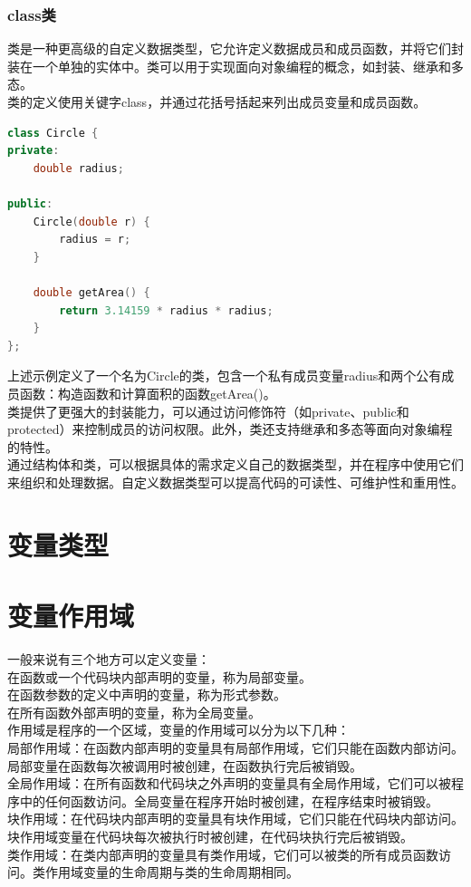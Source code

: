 \documentclass[12pt,twiside,a4paper]{ctexbook}
\numberwithin{chapter}{part}
\begin{document}
\subsubsection{class类}
类是一种更高级的自定义数据类型，它允许定义数据成员和成员函数，并将它们封装在一个单独的实体中。类可以用于实现面向对象编程的概念，如封装、继承和多态。\\
类的定义使用关键字class，并通过花括号括起来列出成员变量和成员函数。
\begin{lstlisting}[language=C++]
class Circle {
private:
    double radius;

public:
    Circle(double r) {
        radius = r;
    }

    double getArea() {
        return 3.14159 * radius * radius;
    }
};
\end{lstlisting}
上述示例定义了一个名为Circle的类，包含一个私有成员变量radius和两个公有成员函数：构造函数和计算面积的函数getArea()。\\
类提供了更强大的封装能力，可以通过访问修饰符（如private、public和protected）来控制成员的访问权限。此外，类还支持继承和多态等面向对象编程的特性。\\
通过结构体和类，可以根据具体的需求定义自己的数据类型，并在程序中使用它们来组织和处理数据。自定义数据类型可以提高代码的可读性、可维护性和重用性。

\section{变量类型}

\section{变量作用域}
一般来说有三个地方可以定义变量：\\
在函数或一个代码块内部声明的变量，称为局部变量。\\
在函数参数的定义中声明的变量，称为形式参数。\\
在所有函数外部声明的变量，称为全局变量。\\
作用域是程序的一个区域，变量的作用域可以分为以下几种：\\
局部作用域：在函数内部声明的变量具有局部作用域，它们只能在函数内部访问。局部变量在函数每次被调用时被创建，在函数执行完后被销毁。\\
全局作用域：在所有函数和代码块之外声明的变量具有全局作用域，它们可以被程序中的任何函数访问。全局变量在程序开始时被创建，在程序结束时被销毁。\\
块作用域：在代码块内部声明的变量具有块作用域，它们只能在代码块内部访问。块作用域变量在代码块每次被执行时被创建，在代码块执行完后被销毁。\\
类作用域：在类内部声明的变量具有类作用域，它们可以被类的所有成员函数访问。类作用域变量的生命周期与类的生命周期相同。
\end{document}
